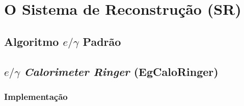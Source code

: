 \section{O Sistema de Reconstrução (SR)}
\label{sec:sr}


\subsection{\texorpdfstring{Algoritmo $e/\gamma$ Padrão}{Algoritmo eGamma Padrão}}
\label{ssec:egamma}




\subsection{\texorpdfstring{$e/\gamma$ \emph{Calorimeter Ringer}
(EgCaloRinger)}{eGamma Calorimeter Ringer (EgCaloRinger)}}
\label{ssec:egringer}


\subsubsection{Implementação}
\label{sssec:egringer_impl}



